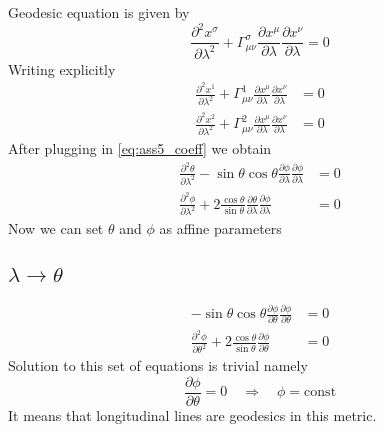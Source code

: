 Geodesic equation is given by
%
\begin{equation}
    \frac{\partial^2 x^\sigma}{\partial \lambda^2} +
    \Gamma^\sigma_{\mu\nu}
    \frac{\partial x^\mu}{\partial \lambda}
    \frac{\partial x^\nu}{\partial \lambda} = 0
\end{equation}
%
Writing explicitly
%
\begin{subequations}
    \begin{align}
        \frac{\partial^2 x^1}{\partial \lambda^2} +
        \Gamma^{1}_{\mu\nu}
        \frac{\partial x^\mu}{\partial \lambda}
        \frac{\partial x^\nu}{\partial \lambda} & = 0 \\
        \frac{\partial^2 x^2}{\partial \lambda^2} +
        \Gamma^{2}_{\mu\nu}
        \frac{\partial x^\mu}{\partial \lambda}
        \frac{\partial x^\nu}{\partial \lambda} & = 0
    \end{align}
\end{subequations}
%
After plugging in \cref{eq:ass5_coeff} we obtain
%
\begin{subequations}
    \begin{align}
        \frac{\partial^2 \theta}{\partial \lambda^2} -
        \sin\theta\cos\theta
        \frac{\partial \phi}{\partial \lambda}
        \frac{\partial \phi}{\partial \lambda} & = 0 \\
        \frac{\partial^2 \phi}{\partial \lambda^2} +
        2\frac{\cos\theta}{\sin\theta}
        \frac{\partial \theta}{\partial \lambda}
        \frac{\partial \phi}{\partial \lambda} & = 0
    \end{align}
\end{subequations}
%
Now we can set $\theta$ and $\phi$ as affine parameters

\subsection*{$\lambda \rightarrow \theta$}

\begin{subequations}
    \begin{align}
        -\sin\theta\cos\theta
        \frac{\partial \phi}{\partial \theta}
        \frac{\partial \phi}{\partial \theta} & = 0 \\
        \frac{\partial^2 \phi}{\partial \theta^2} +
        2\frac{\cos\theta}{\sin\theta}
        \frac{\partial \phi}{\partial \theta} & = 0
    \end{align}
\end{subequations}
%
Solution to this set of equations is trivial namely
%
\begin{equation}
    \frac{\partial \phi}{\partial \theta} = 0
    \quad \Rightarrow \quad
    \phi = \text{const}
\end{equation}
%
It means that longitudinal lines are geodesics in this metric.

